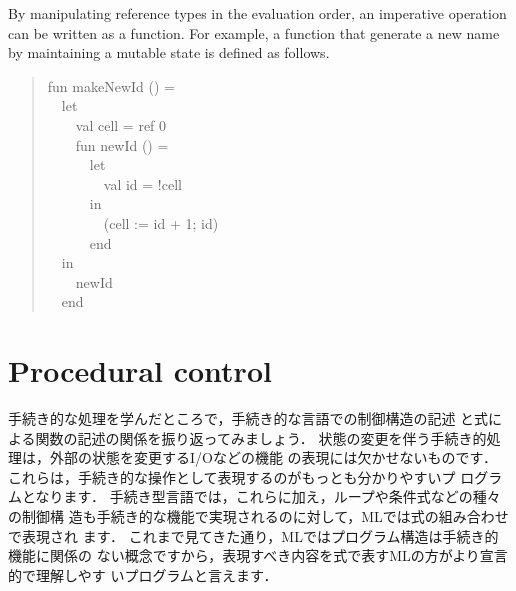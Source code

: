 \documentclass{jbook}
\newcommand{\txt}[2]{#2}
\newcommand{\myem}{\mbox{\ \ }}
\begin{document}
	By manipulating reference types in the evaluation order, 
an imperative operation can be written as a function.
	For example, a function that generate a new name by maintaining
a mutable state is defined as follows.
\begin{tt}
\begin{quote}
fun makeNewId () =\\
\myem let\\
\myem\myem val cell = ref 0\\
\myem\myem fun newId () =\\
\myem\myem\myem let\\
\myem\myem\myem\myem val id = !cell\\
\myem\myem\myem in\\
\myem\myem\myem\myem (cell := id + 1; id)\\
\myem\myem\myem end\\
\myem in\\
\myem\myem newId\\
\myem end
\end{quote}
\end{tt}
\fi%
	
\section{\txt{手続き的制御}{Procedural control}}
\label{sec:tutorialControl}

\ifjp%
	手続き的な処理を学んだところで，手続き的な言語での制御構造の記述
と式による関数の記述の関係を振り返ってみましょう．
	状態の変更を伴う手続き的処理は，外部の状態を変更するI/Oなどの機能
の表現には欠かせないものです．
	これらは，手続き的な操作として表現するのがもっとも分かりやすいプ
ログラムとなります．
	手続き型言語では，これらに加え，ループや条件式などの種々の制御構
造も手続き的な機能で実現されるのに対して，MLでは式の組み合わせで表現され
ます．
	これまで見てきた通り，MLではプログラム構造は手続き的機能に関係の
ない概念ですから，表現すべき内容を式で表すMLの方がより宣言的で理解しやす
いプログラムと言えます．
\end{document}

